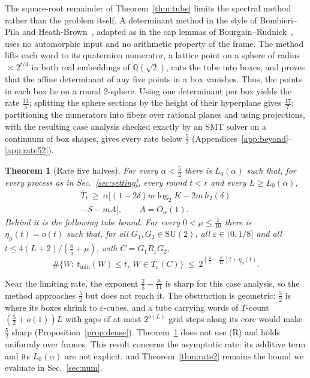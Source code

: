 \documentclass[aps,prx,twocolumn,superscriptaddress,nofootinbib,longbibliography]{revtex4-2}
\theoremstyle{plain}
\newtheorem{theorem}{Theorem}
\theoremstyle{definition}
\theoremstyle{remark}
\newcommand{\Q}{\mathbb{Q}}
\newcommand{\SU}{\mathrm{SU}(2)}
\begin{document}
The square-root remainder of Theorem~\ref{thm:tube} limits the spectral method rather than the problem itself. A determinant method in the style of Bombieri--Pila and Heath-Brown~\cite{BombieriPila,HeathBrown}, adapted as in the cap lemmas of Bourgain--Rudnick~\cite{BourgainRudnick}, uses no automorphic input and no arithmetic property of the frame. The method lifts each word to its quaternion numerator, a lattice point on a sphere of radius $\asymp2^{t/4}$ in both real embeddings of $\Q(\sqrt2)$, cuts the tube into boxes, and proves that the affine determinant of any five points in a box vanishes. Thus, the points in each box lie on a round $2$-sphere. Using one determinant per box yields the rate $\tfrac{11}5$; splitting the sphere sections by the height of their hyperplane gives $\tfrac{17}7$; partitioning the numerators into fibers over rational planes and using projections, with the resulting case analysis checked exactly by an SMT solver on a continuum of box shapes, gives every rate below $\tfrac52$ (Appendices~\ref{app:beyond}--\ref{app:rate52}).


\begin{theorem}[Rate five halves]\label{thm:rate52}
For every $\alpha<\tfrac52$ there is $L_0(\alpha)$ such that, for every process as in Sec.~\ref{sec:setting}, every round $t<r$ and every $L\ge L_0(\alpha)$,
\begin{multline}\label{eq:rate52}
\bar T_t\ \ge\ \alpha\big[(1-2\delta)m\log_2K-2m\,h_2(\delta)\\-S-mA\big],\qquad A=O_\alpha(1).
\end{multline}
Behind it is the following tube bound. For every $0<\mu\le\tfrac1{10}$ there is $\eta_\mu(t)=o(t)$ such that, for all $G_1,G_2\in\SU$, all $\varepsilon\in(0,1/8]$ and all $t\le4(L+2)/(\tfrac85+\mu)$, with $C=G_1R_zG_2$,
\begin{equation}\label{eq:rate52tube}
\#\{W:\ t_{\min}(W)\le t,\ W\in T_\varepsilon(C)\}\ \le\ 2^{(\frac25-\frac\mu{11})t+\eta_\mu(t)}.
\end{equation}
\end{theorem}
Near the limiting rate, the exponent $\tfrac25-\tfrac\mu{11}$ is sharp for this case analysis, so the method approaches $\tfrac52$ but does not reach it. The obstruction is geometric: $\tfrac52$ is where its boxes shrink to $\varepsilon$-cubes, and a tube carrying words of $T$-count $(\tfrac52+o(1))L$ with gaps of at most $2^{o(L)}$ grid steps along its core would make $\tfrac52$ sharp (Proposition~\ref{prop:dense}). Theorem~\ref{thm:rate52} does not use (R) and holds uniformly over frames. This result concerns the asymptotic rate: its additive term and its $L_0(\alpha)$ are not explicit, and Theorem~\ref{thm:rate2} remains the bound we evaluate in Sec.~\ref{sec:num}.
\end{document}
